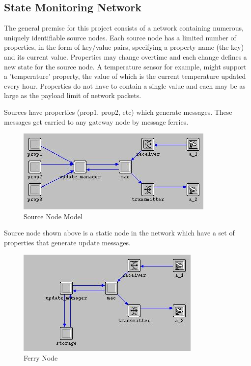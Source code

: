 \subsection{State Monitoring Network}

The general premise for this project consists of a network containing numerous, uniquely identifiable source nodes. 
Each source node has a limited number of properties, in the form of key/value pairs, specifying a property name (the key) and its current value.
Properties may change overtime and each change defines a new state for the source node.
A temperature sensor for example, might support a 'temperature' property, the value of which is the current temperature updated every hour.
Properties do not have to contain a single value and each may be as large as the payload limit of network packets. %

%

Sources have properties (prop1, prop2, etc) which generate messages. These messages get carried to any gateway node by message ferries.

\begin{figure}[h]
    \centering
    \includegraphics[width=.5\textwidth]{images/source}
    \caption{Source Node Model}
    \label{fig:source}
\end{figure}

Source node shown above is a static node in the network which have a set of properties that generate update messages. 	

\begin{figure}[h]
    \centering
    \includegraphics[width=.5\textwidth]{images/ferry}
    \caption{Ferry Node}
    \label{fig:Ferry}
\end{figure}

